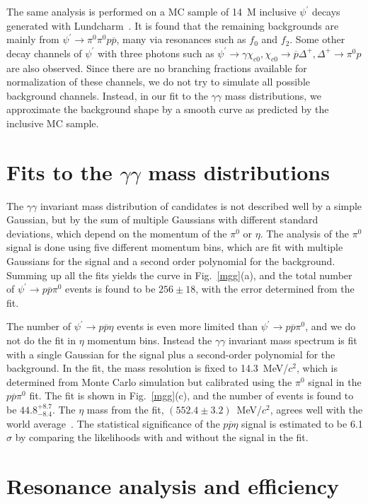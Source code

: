 \documentclass[prd,twocolumn,showpacs,amsmath,amssymb]{revtex4}
\newcommand{\psip}{\psi^\prime}
\newcommand{\chicz}{\chi_{c0}}
\newcommand{\piz}{\pi^0}
\newcommand{\ppb}{p\overline{p}}
\newcommand{\psipto}{\psi^\prime \rightarrow }
\newcommand{\pspto}{\psi^\prime \rightarrow }
\newcommand{\chiczto}{\chi_{c0} \rightarrow }
\newcommand{\g}{\gamma}
\begin{document}
The same analysis is performed on a MC sample of 14~M inclusive
$\psip$ decays generated with Lundcharm~\cite{lundcharm}. It is
found that the remaining backgrounds are mainly from $\psipto \piz
\piz \ppb$, many via resonances such as $f_0$ and $f_2$. Some
other decay channels of $\psip$ with three photons such as
$\psipto \gamma \chicz, \chiczto \overline{p} \Delta^+, \Delta^+
\rightarrow \piz p$ are also observed. Since there are no
branching fractions  available for normalization of these
channels, we do not try to simulate all possible background
channels. Instead, in our fit to the $\g\g$ mass distributions, we
approximate the background shape by a smooth curve as predicted by
the inclusive MC sample.

\section{\boldmath Fits to the $\g\g$ mass distributions}

The $\g\g$ invariant mass distribution of candidates is not
described well by a simple Gaussian, but by the sum of multiple
Gaussians with different standard deviations, which depend on the
momentum of the $\piz$ or $\eta$. The analysis of the $\piz$
signal is done using five different momentum bins, which are fit
with multiple Gaussians for the signal and a second order
polynomial for the background. Summing up all the fits yields the
curve in Fig.~\ref{mgg}(a), and the total number of $\pspto \ppb
\piz$ events is found to be $256\pm 18$, with the error determined
from the fit.

The number of $\pspto \ppb \eta$ events is even more limited than
$\pspto \ppb \piz$, and we do not do the fit in $\eta$ momentum
bins. Instead the $\g\g$ invariant mass spectrum is fit with a
single Gaussian for the signal plus a second-order polynomial for
the background. In the fit, the mass resolution is fixed to
14.3~MeV/$c^2$, which is determined from Monte Carlo simulation
but calibrated using the $\piz$ signal in the $\ppb\piz$ fit. The
fit is shown in Fig.~\ref{mgg}(c), and the number of events is
found to be $44.8^{+8.7}_{-8.4}$. The $\eta$ mass from the fit,
$(552.4\pm 3.2)$~MeV/$c^2$, agrees well with the world
average~\cite{pdg}. The statistical significance of the $\ppb\eta$
signal is estimated to be 6.1$\sigma$ by comparing the likelihoods
with and without the signal in the fit.

\section{Resonance analysis and efficiency}\label{effi}
\end{document}
